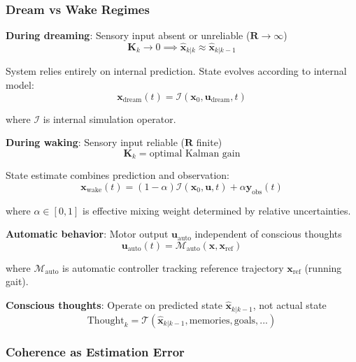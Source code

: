 \documentclass[11pt,onecolumn]{article}
\begin{document}
\subsubsection{Dream vs Wake Regimes}

\textbf{During dreaming}: Sensory input absent or unreliable ($\mathbf{R} \to \infty$)
\begin{equation}
\mathbf{K}_k \to 0 \implies \hat{\mathbf{x}}_{k|k} \approx \hat{\mathbf{x}}_{k|k-1}
\end{equation}

System relies entirely on internal prediction. State evolves according to internal model:
\begin{equation}
\mathbf{x}_{\text{dream}}(t) = \mathcal{I}(\mathbf{x}_0, \mathbf{u}_{\text{dream}}, t)
\end{equation}

where $\mathcal{I}$ is internal simulation operator.

\textbf{During waking}: Sensory input reliable ($\mathbf{R}$ finite)
\begin{equation}
\mathbf{K}_k = \text{optimal Kalman gain}
\end{equation}

State estimate combines prediction and observation:
\begin{equation}
\mathbf{x}_{\text{wake}}(t) = (1-\alpha)\mathcal{I}(\mathbf{x}_0, \mathbf{u}, t) + \alpha\mathbf{y}_{\text{obs}}(t)
\end{equation}

where $\alpha \in [0,1]$ is effective mixing weight determined by relative uncertainties.

\textbf{Automatic behavior}: Motor output $\mathbf{u}_{\text{auto}}$ independent of conscious thoughts
\begin{equation}
\mathbf{u}_{\text{auto}}(t) = \mathcal{M}_{\text{auto}}(\mathbf{x}, \mathbf{x}_{\text{ref}})
\end{equation}

where $\mathcal{M}_{\text{auto}}$ is automatic controller tracking reference trajectory $\mathbf{x}_{\text{ref}}$ (running gait).

\textbf{Conscious thoughts}: Operate on predicted state $\hat{\mathbf{x}}_{k|k-1}$, not actual state
\begin{equation}
\text{Thought}_k = \mathcal{T}(\hat{\mathbf{x}}_{k|k-1}, \text{memories}, \text{goals}, ...)
\end{equation}

\subsubsection{Coherence as Estimation Error}
\end{document}
